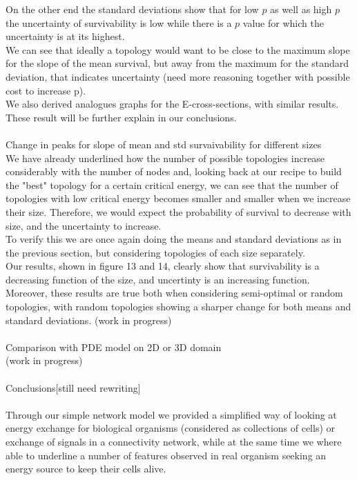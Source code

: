 \documentclass{amsart}
\theoremstyle{plain}
\numberwithin{equation}{section}
\begin{document}
On the other end the standard deviations show that for low $p$ as well as high $p$ the uncertainty of survivability is low while there is a $p$ value for which the uncertainty is at its highest.\\
We can see that ideally a topology would want to be close to the maximum slope for the slope of the mean survival, but away from the maximum for the standard deviation, that indicates uncertainty (need more reasoning together with  possible cost to increase p). \\
We also derived analogues graphs for the E-cross-sections, with similar results.\\
These result will be further explain in our conclusions.\\\\
Change in peaks for slope of mean and std survaivability for different sizes\\
We have already underlined how the number of possible topologies increase considerably with the number of nodes and, looking back at our recipe to build the "best" topology for a certain critical energy, we can see that the number of topologies with low critical energy becomes smaller and smaller when we increase their size. Therefore, we would expect the probability of survival to decrease with size, and the uncertainty to increase.\\
To verify this we are once again doing the means and standard deviations as in the previous section, but considering topologies of each size separately. \\
Our results, shown in figure 13 and 14, clearly show that survivability is a decreasing function of the size, and uncertinty is an increasing function. Moreover, these results are true both when considering semi-optimal or random topologies, with random topologies showing a sharper change for both means and standard deviations. (work in progress)\\\\
Comparison with PDE model on 2D or 3D domain\\
(work in progress)\\\\
Conclusions[still need rewriting]\\
\\
Through our simple network model we provided a simplified way of looking at energy exchange for biological organisms (considered as collections of cells) or exchange of signals in a connectivity network, while at the same time we where able to underline a number of features observed in real organism seeking an energy source to keep their cells alive.\\
\end{document}
